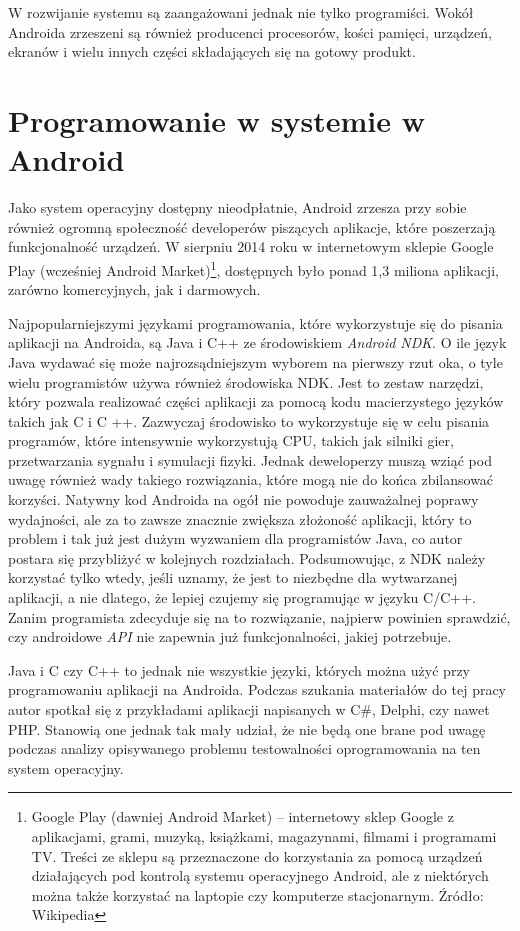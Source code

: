 W rozwijanie systemu są zaangażowani jednak nie tylko programiści. Wokół Androida zrzeszeni są również producenci procesorów, kości pamięci, urządzeń, ekranów i wielu innych części składających się na gotowy produkt.

\section{Programowanie w systemie w Android}
Jako system operacyjny dostępny nieodpłatnie, Android zrzesza przy sobie również ogromną społeczność developerów piszących aplikacje, które poszerzają funkcjonalność urządzeń. W sierpniu 2014 roku w internetowym sklepie Google Play (wcześniej Android Market)\footnote{Google Play (dawniej Android Market) – internetowy sklep Google z aplikacjami, grami, muzyką, książkami, magazynami, filmami i programami TV. Treści ze sklepu są przeznaczone do korzystania za pomocą urządzeń działających pod kontrolą systemu operacyjnego Android, ale z niektórych można także korzystać na laptopie czy komputerze stacjonarnym. Źródło: Wikipedia}, dostępnych było ponad 1,3 miliona aplikacji, zarówno komercyjnych, jak i darmowych.

Najpopularniejszymi językami programowania, które wykorzystuje się do pisania aplikacji na Androida, są Java i C++ ze środowiskiem \textit{Android NDK}. O ile język Java wydawać się może najrozsądniejszym wyborem na pierwszy rzut oka, o tyle wielu programistów używa również środowiska NDK. Jest to zestaw narzędzi, który pozwala realizować części aplikacji za pomocą kodu macierzystego języków takich jak C i C ++. Zazwyczaj środowisko to wykorzystuje się w celu pisania programów, które intensywnie wykorzystują CPU, takich jak silniki gier, przetwarzania sygnału i symulacji fizyki. Jednak deweloperzy muszą wziąć pod uwagę również wady takiego rozwiązania, które mogą nie do końca zbilansować korzyści. Natywny kod Androida na ogół nie powoduje zauważalnej poprawy wydajności, ale za to zawsze znacznie zwiększa złożoność aplikacji, który to problem i tak już jest dużym wyzwaniem dla programistów Java, co autor postara się przybliżyć w kolejnych rozdziałach. Podsumowując, z NDK należy korzystać tylko wtedy, jeśli uznamy, że jest to niezbędne dla wytwarzanej aplikacji, a nie dlatego, że lepiej czujemy się programując w języku C/C++. Zanim programista zdecyduje się na to rozwiązanie, najpierw powinien sprawdzić, czy androidowe \textit{API} nie zapewnia już funkcjonalności, jakiej potrzebuje.

Java i C czy C++ to jednak nie wszystkie języki, których można użyć przy programowaniu aplikacji na Androida. Podczas szukania materiałów do tej pracy autor spotkał się z przykładami aplikacji napisanych w C\#, Delphi, czy nawet PHP. Stanowią one jednak tak mały udział, że nie będą one brane pod uwagę podczas analizy opisywanego problemu testowalności oprogramowania na ten system operacyjny.


